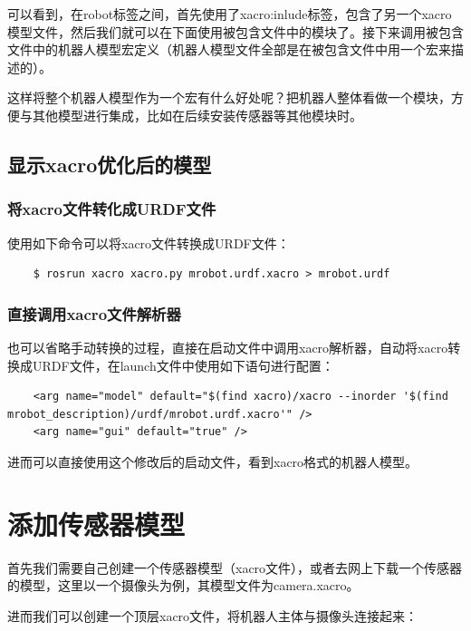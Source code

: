 \documentclass[10pt, oneside]{book}
\begin{document}
可以看到，在robot标签之间，首先使用了xacro:inlude标签，包含了另一个xacro模型文件，然后我们就可以在下面使用被包含文件中的模块了。接下来调用被包含文件中的机器人模型宏定义（机器人模型文件全部是在被包含文件中用一个宏来描述的）。

这样将整个机器人模型作为一个宏有什么好处呢？把机器人整体看做一个模块，方便与其他模型进行集成，比如在后续安装传感器等其他模块时。

\subsection{显示xacro优化后的模型}

\subsubsection{将xacro文件转化成URDF文件}

使用如下命令可以将xacro文件转换成URDF文件：

\begin{verbatim}
    $ rosrun xacro xacro.py mrobot.urdf.xacro > mrobot.urdf
\end{verbatim}

\subsubsection{直接调用xacro文件解析器}

也可以省略手动转换的过程，直接在启动文件中调用xacro解析器，自动将xacro转换成URDF文件，在launch文件中使用如下语句进行配置：

\begin{verbatim}
    <arg name="model" default="$(find xacro)/xacro --inorder '$(find mrobot_description)/urdf/mrobot.urdf.xacro'" />
	<arg name="gui" default="true" />
\end{verbatim}

进而可以直接使用这个修改后的启动文件，看到xacro格式的机器人模型。

\section{添加传感器模型}

首先我们需要自己创建一个传感器模型（xacro文件），或者去网上下载一个传感器的模型，这里以一个摄像头为例，其模型文件为camera.xacro。

进而我们可以创建一个顶层xacro文件，将机器人主体与摄像头连接起来：
\end{document}
